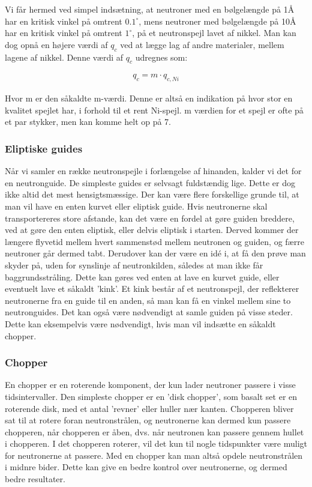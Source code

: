 \documentclass[12pt,oneside,a4paper]{article}
\begin{document}
{{{{{Vi får hermed ved simpel indsætning, at neutroner med en bølgelængde på 1Å har en kritisk vinkel på omtrent $0.1^∘$, mens neutroner med bølgelængde på 10Å har en kritisk vinkel på omtrent $1^∘$, på et neutronspejl lavet af nikkel.
Man kan dog opnå en højere værdi af $q_c$ ved at lægge lag af andre materialer, mellem lagene af nikkel. Denne værdi af $q_c$ udregnes som:

\begin{align}
q_c=m \cdot q_{c,Ni}
\end{align}

Hvor m er den såkaldte m-værdi. Denne er altså en indikation på hvor stor en kvalitet spejlet har, i forhold til et rent Ni-spejl. m værdien for et spejl er ofte på et par stykker, men kan komme helt op på 7. \cite{lefmann_arleth_kirkensgaard_lebech_thomsen}

\subsubsection{Eliptiske guides}
Når vi samler en række neutronspejle i forlængelse af hinanden, kalder vi det for en neutronguide. De simpleste guides er selvsagt fuldstændig lige. Dette er dog ikke altid det mest hensigtsmæssige. Der kan være flere forskellige grunde til, at man vil have en enten kurvet eller eliptisk guide. Hvis neutronerne skal transportereres store afstande, kan det være en fordel at gøre guiden breddere, ved at gøre den enten eliptisk, eller delvis eliptisk i starten. Derved kommer der længere flyvetid mellem hvert sammenstød mellem neutronen og guiden, og færre neutroner går dermed tabt. Derudover kan der være en idé i, at få den prøve man skyder på, uden for synslinje af neutronkilden, således at man ikke får baggrundsstråling. Dette kan gøres ved enten at lave en kurvet guide, eller eventuelt lave et såkaldt 'kink'. Et kink består af et neutronspejl, der reflekterer neutronerne fra en guide til en anden, så man kan få en vinkel mellem sine to neutronguides. 
Det kan også være nødvendigt at samle guiden på visse steder. Dette kan eksempelvis være nødvendigt, hvis man vil indsætte en såkaldt chopper.

\subsubsection{Chopper}
En chopper er en roterende komponent, der kun lader neutroner passere i visse tidsintervaller. Den simpleste chopper er en 'disk chopper', som basalt set er en roterende disk, med et antal 'revner' eller huller nær kanten. Chopperen bliver sat til at rotere foran neutronstrålen, og neutronerne kan dermed kun passere chopperen, når chopperen er åben, dvs. når neutronen kan passere gennem hullet i chopperen. I det chopperen roterer, vil det kun til nogle tidspunkter være muligt for neutronerne at passere. Med en chopper kan man altså opdele neutronstrålen i midnre bider. Dette kan give en bedre kontrol over neutronerne, og dermed bedre resultater.

}}}}}
\end{document}
